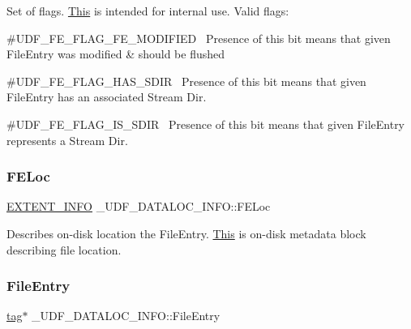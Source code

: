 Set of flags. \hyperlink{namespace_this}{This} is intended for internal use. Valid flags\+:
\begin{DoxyItemize}
\item \#\+U\+D\+F\+\_\+\+F\+E\+\_\+\+F\+L\+A\+G\+\_\+\+F\+E\+\_\+\+M\+O\+D\+I\+F\+I\+ED~\newline
 Presence of this bit means that given File\+Entry was modified \& should be flushed
\item \#\+U\+D\+F\+\_\+\+F\+E\+\_\+\+F\+L\+A\+G\+\_\+\+H\+A\+S\+\_\+\+S\+D\+IR~\newline
 Presence of this bit means that given File\+Entry has an associated Stream Dir.
\item \#\+U\+D\+F\+\_\+\+F\+E\+\_\+\+F\+L\+A\+G\+\_\+\+I\+S\+\_\+\+S\+D\+IR~\newline
 Presence of this bit means that given File\+Entry represents a Stream Dir. 
\end{DoxyItemize}\mbox{\label{struct___u_d_f___d_a_t_a_l_o_c___i_n_f_o_a412523da551f2c58ace14d1ca23b5ec8}} 
\subsubsection{\texorpdfstring{F\+E\+Loc}{FELoc}}
{\footnotesize\ttfamily \hyperlink{struct___e_x_t_e_n_t___i_n_f_o}{E\+X\+T\+E\+N\+T\+\_\+\+I\+N\+FO} \+\_\+\+U\+D\+F\+\_\+\+D\+A\+T\+A\+L\+O\+C\+\_\+\+I\+N\+F\+O\+::\+F\+E\+Loc}

Describes on-\/disk location the File\+Entry. \hyperlink{namespace_this}{This} is on-\/disk metadata block describing file location. \mbox{\label{struct___u_d_f___d_a_t_a_l_o_c___i_n_f_o_aaf8ffd0e631978872f812f5eae001efa}} 
\subsubsection{\texorpdfstring{File\+Entry}{FileEntry}}
{\footnotesize\ttfamily \hyperlink{structtag}{tag}$\ast$ \+\_\+\+U\+D\+F\+\_\+\+D\+A\+T\+A\+L\+O\+C\+\_\+\+I\+N\+F\+O\+::\+File\+Entry}

